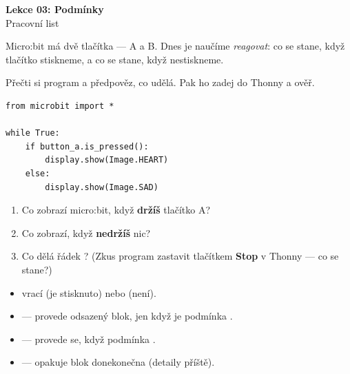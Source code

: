 \newcommand{\lekce}{Lekce 03 -- Pracovní list}




\begin{center}
  {\Large\bfseries\textcolor{microbit-blue}{Lekce 03: Podmínky}}\\[4pt]
  {\large Pracovní list}
\end{center}

\medskip\noindent
Micro:bit má dvě tlačítka — A a B. Dnes je naučíme \emph{reagovat}:
co se stane, když tlačítko stiskneme, a co se stane, když nestiskneme.

\begin{ukol}

Přečti si program a předpověz, co udělá. Pak ho zadej do Thonny a ověř.

\begin{lstlisting}
from microbit import *

while True:
    if button_a.is_pressed():
        display.show(Image.HEART)
    else:
        display.show(Image.SAD)
\end{lstlisting}

\begin{enumerate}
  \item Co zobrazí micro:bit, když \textbf{držíš} tlačítko A?
  \item Co zobrazí, když \textbf{nedržíš} nic?
  \item Co dělá řádek ? (Zkus program zastavit
        tlačítkem \textbf{Stop} v Thonny — co se stane?)
\end{enumerate}

\odpoved[2.5cm]

\begin{tcolorbox}[colback=code-bg, colframe=gray!40,
                  fonttitle=\small\bfseries, title=Klíčové pojmy]
  \small
  \begin{itemize}[leftmargin=*]
    \item {} vrací  (je stisknuto)
          nebo  (není).
    \item {} — provede odsazený blok, jen když je podmínka .
    \item {} — provede se, když podmínka .
    \item {} — opakuje blok donekonečna (detaily příště).
  \end{itemize}
\end{tcolorbox}

\end{ukol}

